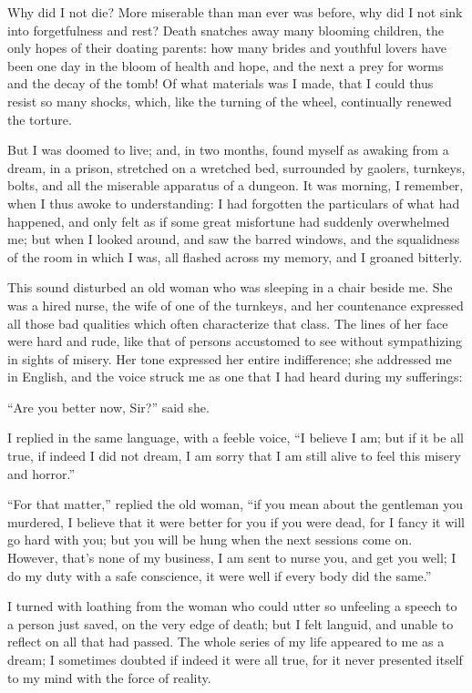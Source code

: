 Why did I not die? More miserable
than man ever was before, why did
I not sink into forgetfulness and rest?
Death snatches away many blooming
children, the only hopes of their doating
parents: how many brides and
youthful lovers have been one day in
the bloom of health and hope, and the
next a prey for worms and the decay
of the tomb! Of what materials was
I made, that I could thus resist so many
shocks, which, like the turning of the
wheel, continually renewed the torture.

But I was doomed to live; and, in
two months, found myself as awaking
from a dream, in a prison, stretched on
a wretched bed, surrounded by gaolers,
turnkeys, bolts, and all the miserable apparatus
of a dungeon. It was morning,
I remember, when I thus awoke to understanding:
I had forgotten the particulars
of what had happened, and
only felt as if some great misfortune
had suddenly overwhelmed me; but
when I looked around, and saw the
barred windows, and the squalidness
of the room in which I was, all flashed
across my memory, and I groaned bitterly.

This sound disturbed an old woman
who was sleeping in a chair beside me.
She was a hired nurse, the wife of one
of the turnkeys, and her countenance
expressed all those bad qualities which
often characterize that class. The lines
of her face were hard and rude, like
that of persons accustomed to see without
sympathizing in sights of misery.
Her tone expressed her entire indifference;
she addressed me in English,
and the voice struck me as one that I
had heard during my sufferings:

``Are you better now, Sir?'' said
she.

I replied in the same language, with
a feeble voice, ``I believe I am; but
if it be all true, if indeed I did not
dream, I am sorry that I am still alive
to feel this misery and horror.''

``For that matter,'' replied the old
woman, ``if you mean about the gentleman
you murdered, I believe that
it were better for you if you were dead,
for I fancy it will go hard with you;
but you will be hung when the next
sessions come on. However, that's
none of my business, I am sent to nurse
you, and get you well; I do my duty
with a safe conscience, it were well if
every body did the same.''

I turned with loathing from the woman
who could utter so unfeeling a
speech to a person just saved, on the
very edge of death; but I felt languid,
and unable to reflect on all that had
passed. The whole series of my life
appeared to me as a dream; I sometimes
doubted if indeed it were all true,
for it never presented itself to my mind
with the force of reality.

